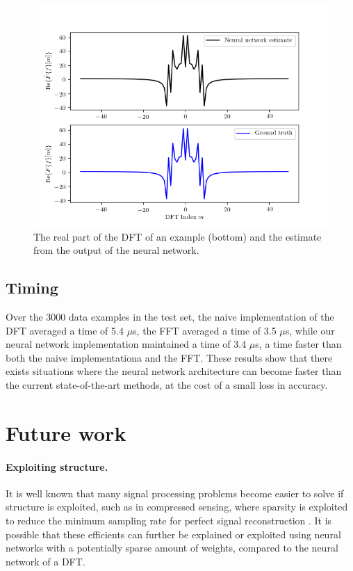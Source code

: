 \documentclass[12pt]{article}
\begin{document}
\begin{figure}
\centering
\includegraphics[scale=.65]{figures/DFT_comparisons.png}
\caption{The real part of the DFT of an example (bottom) and the estimate from the output of the neural network.}
\label{f-DFT_compare}
\end{figure}

\subsection{Timing}
Over the 3000 data examples in the test set, the naive implementation of the DFT averaged a time of 5.4 $\mu$s,
the FFT averaged a time of 3.5 $\mu$s, while our neural network implementation maintained a time of 3.4 $\mu$s, a time
faster than both the naive implementationa and the FFT. These results show that there exists situations where the neural
network architecture can become faster than the current state-of-the-art methods, at the cost of a small loss in accuracy.

\section{Future work}

\paragraph{Exploiting structure.} It is well known that many signal processing problems become easier to solve if structure is
exploited, such as in compressed sensing, where sparsity is exploited to reduce the minimum sampling rate for perfect signal
reconstruction \cite{D:06}. It is possible that these efficients can further be explained or exploited using neural networks
with a potentially sparse amount of weights, compared to the neural network of a DFT.
\end{document}
